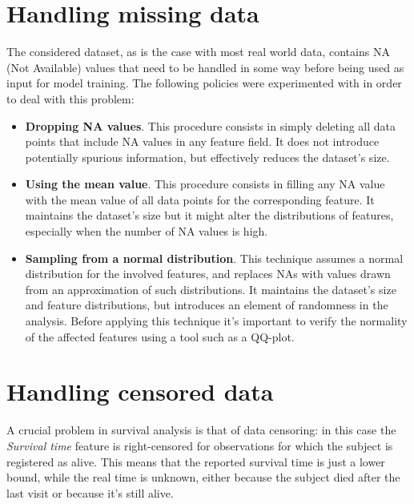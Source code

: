 \documentclass[12pt]{report}
\begin{document}
\section{Handling missing data}
The considered dataset, as is the case with most real world data, contains NA (Not Available) values that need to be handled in some way before being used as input for model training. The following policies were experimented with in order to deal with this problem:
\begin{itemize}
\item \textbf{Dropping NA values}. This procedure consists in simply deleting all data points that include NA values in any feature field. It does not introduce potentially spurious information, but effectively reduces the dataset's size.
\item \textbf{Using the mean value}. This procedure consists in filling any NA value with the mean value of all data points for the corresponding feature. It maintains the dataset's size but it might alter the distributions of features, especially when the number of NA values is high.
\item \textbf{Sampling from a normal distribution}. This technique assumes a normal distribution for the involved features, and replaces NAs with values drawn from an approximation of such distributions. It maintains the dataset's size and feature distributions, but introduces an element of randomness in the analysis. Before applying this technique it's important to verify the normality of the affected features using a tool such as a QQ-plot.
\end{itemize}


\section{Handling censored data} \label{handlcens}
A crucial problem in survival analysis is that of data censoring: in this case the \textit{Survival time} feature is right-censored for observations for which the subject is registered as alive. This means that the reported survival time is just a lower bound, while the real time is unknown, either because the subject died after the last visit or because it's still alive.
\end{document}
